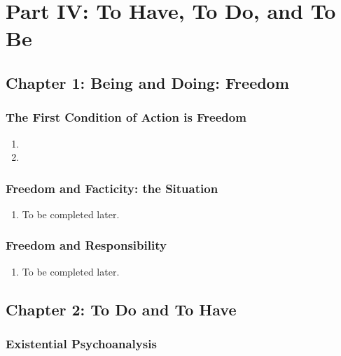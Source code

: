 \chapter{Part IV: To Have, To Do, and To Be}

\section{Chapter 1: Being and Doing: Freedom}

\subsection{The First Condition of Action is Freedom}

\begin{enumerate}
  \item {}
  \item {}
\end{enumerate}

\subsection{Freedom and Facticity: the Situation}

\begin{enumerate}
  \item To be completed later.
\end{enumerate}

\subsection{Freedom and Responsibility}

\begin{enumerate}
  \item To be completed later.
\end{enumerate}

\section{Chapter 2: To Do and To Have}

\subsection{Existential Psychoanalysis}

